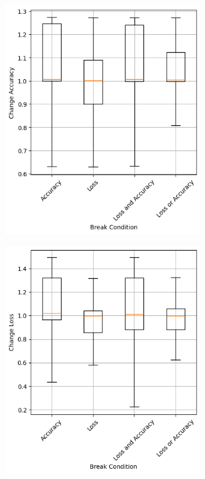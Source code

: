 \begin{figure}
    \begin{subfigure}{0.5\textwidth}
        \centering
        \includegraphics[width=0.95\textwidth]{plots/BreakCondition_NotTrained_accuracy.png}
    \end{subfigure}
    \begin{subfigure}{0.5\textwidth}
        \centering
        \includegraphics[width=0.95\textwidth]{plots/BreakCondition_NotTrained_loss.png}

\end{subfigure}
\end{figure}
